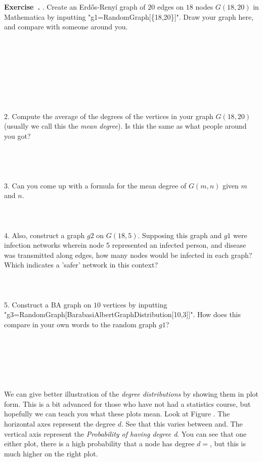 \documentclass[12pt]{article}
\newcounter{exercise}[section]
\newenvironment{exercise}[1][]{\refstepcounter{exercise}\par\medskip
	\noindent \textbf{Exercise~\thesection.\theexercise #1} \rmfamily}{\medskip}
\begin{document}
\begin{exercise}
1. Create an Erdős-Renyí graph of $20$ edges on $18$ nodes $G(18,20)$ in Mathematica by inputting "g1=RandomGraph[\{18,20\}]". Draw your graph here, and compare with someone around you.
\\
\\
\\
\\
\\
\\
\\
\\
\\
2. Compute the average of the degrees of the vertices in your graph $G(18,20)$ (usually we call this the \emph{mean degree}). Is this the same as what people around you got?
\\
\\
\\
\\
\\
3. Can you come up with a formula for the mean degree of $G(m,n)$ given $m$ and $n$.
\\
\\
\\
\\
4. Also, construct a graph $g2$ on $G(18,5)$. Supposing this graph and  $g1$ were infection networks wherein node 5 represented an infected person, and disease was transmitted along edges, how many nodes would be infected in each graph? Which indicates a 'safer' network in this context?
\\
\\
\\
\\
5. Construct a BA graph on $10$ vertices by inputting \\ "g3=RandomGraph[BarabasiAlbertGraphDistribution[10,3]]". How does this compare in your own words to the random graph $g1$?
\\
\\
\\
\\
\\
\\
\end{exercise}
\\
We can give better illustration of the \emph{degree distributions} by showing them in plot form. This is a bit advanced for those who have not had a statistics course, but hopefully we can teach you what these plots mean. Look at Figure .  The horizontal axes represent the degree $d$. See that this varies between and. The vertical axis represent the \emph{Probability of having degree d}. You can see that one either plot, there is a high probability that a node has degree $d=$, but this is much higher on the right plot.
\end{document}
